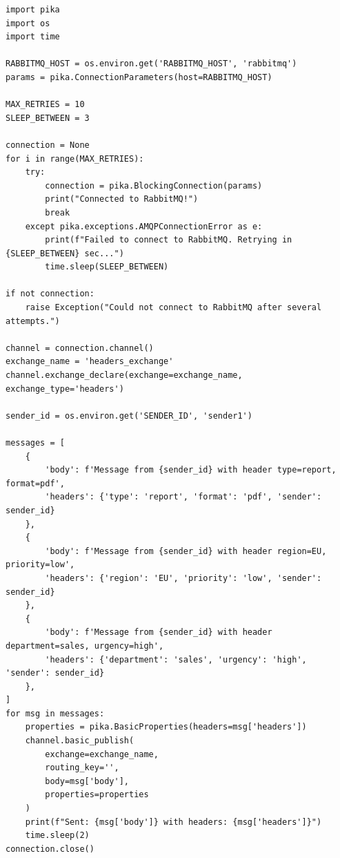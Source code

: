 \documentclass[areasetadvanced]{scrartcl}
\begin{document}
\begin{lstlisting}
import pika
import os
import time

RABBITMQ_HOST = os.environ.get('RABBITMQ_HOST', 'rabbitmq')
params = pika.ConnectionParameters(host=RABBITMQ_HOST)

MAX_RETRIES = 10
SLEEP_BETWEEN = 3  

connection = None
for i in range(MAX_RETRIES):
    try:
        connection = pika.BlockingConnection(params)
        print("Connected to RabbitMQ!")
        break
    except pika.exceptions.AMQPConnectionError as e:
        print(f"Failed to connect to RabbitMQ. Retrying in {SLEEP_BETWEEN} sec...")
        time.sleep(SLEEP_BETWEEN)

if not connection:
    raise Exception("Could not connect to RabbitMQ after several attempts.")

channel = connection.channel()
exchange_name = 'headers_exchange'
channel.exchange_declare(exchange=exchange_name, exchange_type='headers')

sender_id = os.environ.get('SENDER_ID', 'sender1')

messages = [
    {
        'body': f'Message from {sender_id} with header type=report, format=pdf',
        'headers': {'type': 'report', 'format': 'pdf', 'sender': sender_id}
    },
    {
        'body': f'Message from {sender_id} with header region=EU, priority=low',
        'headers': {'region': 'EU', 'priority': 'low', 'sender': sender_id}
    },
    {
        'body': f'Message from {sender_id} with header department=sales, urgency=high',
        'headers': {'department': 'sales', 'urgency': 'high', 'sender': sender_id}
    },
]
for msg in messages:
    properties = pika.BasicProperties(headers=msg['headers'])
    channel.basic_publish(
        exchange=exchange_name,
        routing_key='',
        body=msg['body'],
        properties=properties
    )
    print(f"Sent: {msg['body']} with headers: {msg['headers']}")
    time.sleep(2)
connection.close()
\end{lstlisting}
\end{document}
